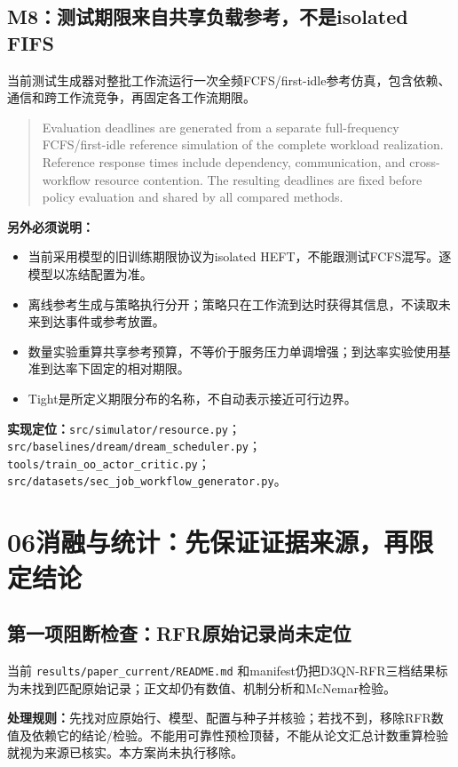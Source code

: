 \documentclass[UTF8,11pt,a4paper,fontset=fandol]{ctexart}
\newenvironment{draft}{\begin{quote}\small\setlength{\parskip}{4pt}}{\end{quote}}
\newcommand{\partpage}[2]{\section*{#1\quad #2}}
\newcommand{\code}[1]{\nolinkurl{#1}}
\begin{document}
\subsection*{M8：测试期限来自共享负载参考，不是isolated FIFS}
当前测试生成器对整批工作流运行一次全频FCFS/first-idle参考仿真，包含依赖、通信和跨工作流竞争，再固定各工作流期限。
\begin{draft}
Evaluation deadlines are generated from a separate full-frequency FCFS/first-idle reference simulation of the complete workload realization. Reference response times include dependency, communication, and cross-workflow resource contention. The resulting deadlines are fixed before policy evaluation and shared by all compared methods.
\end{draft}
\textbf{另外必须说明：}
\begin{itemize}
\item 当前采用模型的旧训练期限协议为isolated HEFT，不能跟测试FCFS混写。逐模型以冻结配置为准。
\item 离线参考生成与策略执行分开；策略只在工作流到达时获得其信息，不读取未来到达事件或参考放置。
\item 数量实验重算共享参考预算，不等价于服务压力单调增强；到达率实验使用基准到达率下固定的相对期限。
\item Tight是所定义期限分布的名称，不自动表示接近可行边界。
\end{itemize}

\textbf{实现定位：}\code{src/simulator/resource.py}；\code{src/baselines/dream/dream_scheduler.py}；\code{tools/train_oo_actor_critic.py}；\code{src/datasets/sec_job_workflow_generator.py}。

\newpage
\partpage{06}{消融与统计：先保证证据来源，再限定结论}
\subsection*{第一项阻断检查：RFR原始记录尚未定位}
当前 \code{results/paper_current/README.md} 和manifest仍把D3QN-RFR三档结果标为未找到匹配原始记录；正文却仍有数值、机制分析和McNemar检验。
\begin{risk}
\textbf{处理规则：}先找对应原始行、模型、配置与种子并核验；若找不到，移除RFR数值及依赖它的结论/检验。不能用可靠性预检顶替，不能从论文汇总计数重算检验就视为来源已核实。本方案尚未执行移除。
\end{risk}
\end{document}
